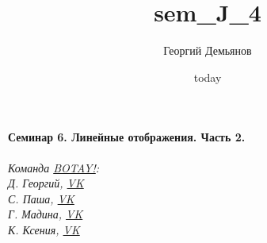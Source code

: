 \documentclass[a4paper,12pt]{article}
\title{sem_J_4}
\author{Георгий Демьянов}
\date{today}
\begin{document}
\paragraph{{\LARGE Семинар 6. Линейные отображения. Часть 2.}\\}












\begin{center}
	\vfill \emph{{\small Команда \href{https://vk.com/botay_fizteh}{BOTAY!}:\\
			Д. Георгий, \href{https://vk.com/id37346992}{VK}\\
			С. Паша,
			\href{https://vk.com/id181006282}{VK}\\
			Г. Мадина, \href{https://vk.com/id226312463}{VK}\\
			К. Ксения, \href{https://vk.com/id143862366}{VK}\\
	}}
\end{center}
\end{document}
